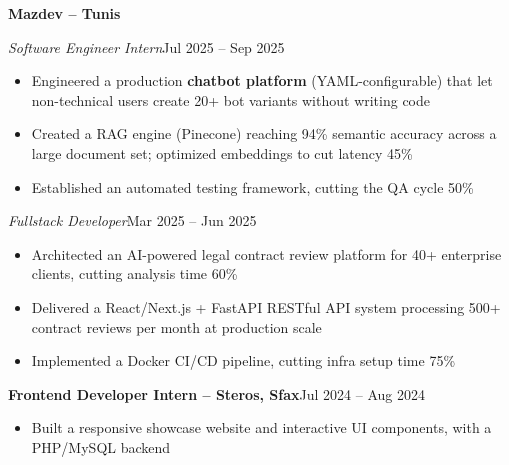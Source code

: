 \documentclass[10pt,a4paper]{article}
\newcommand{\entry}[2]{\vspace{1pt}\noindent\textbf{#1}\hfill{\color{muted}#2}\par}
\newcommand{\subentry}[2]{\noindent\textit{#1}\hfill{\color{muted}#2}\par}
\begin{document}
\entry{Mazdev -- Tunis}{}
\subentry{Software Engineer Intern}{Jul 2025 -- Sep 2025}
\begin{itemize}
  \item Engineered a production \textbf{chatbot platform} (YAML-configurable) that let non-technical users create 20+ bot variants without writing code
  \item Created a RAG engine (Pinecone) reaching 94\% semantic accuracy across a large document set; optimized embeddings to cut latency 45\%
  \item Established an automated testing framework, cutting the QA cycle 50\%
\end{itemize}
\subentry{Fullstack Developer}{Mar 2025 -- Jun 2025}
\begin{itemize}
  \item Architected an AI-powered legal contract review platform for 40+ enterprise clients, cutting analysis time 60\%
  \item Delivered a React/Next.js + FastAPI RESTful API system processing 500+ contract reviews per month at production scale
  \item Implemented a Docker CI/CD pipeline, cutting infra setup time 75\%
\end{itemize}

\entry{Frontend Developer Intern -- Steros, Sfax}{Jul 2024 -- Aug 2024}
\begin{itemize}
  \item Built a responsive showcase website and interactive UI components, with a PHP/MySQL backend
\end{itemize}
\end{document}
